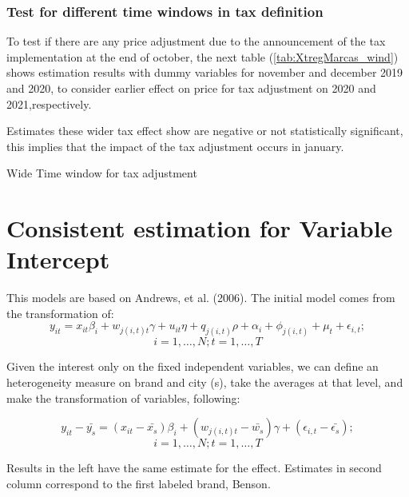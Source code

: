 \documentclass[]{article}
\begin{document}
\subsubsection{Test for different time windows in tax definition}
To test if there are any price adjustment due to the announcement of the tax implementation at the end of october, the next table (\ref{tab:XtregMarcas_wind}) shows estimation results with dummy variables for november and december 2019 and 2020, to consider earlier effect on price for tax adjustment on 2020 and 2021,respectively.
 
Estimates these wider tax effect show are negative or not statistically significant, this implies that the impact of the tax adjustment occurs in january. 

\begin{landscape}
 	\begin{table}[ht]
 	\centering
 	\caption{Wide Time window for tax adjustment \label{tab:XtregMarcas_wind}}
 	
 \end{table}
\end{landscape}
 
\section{Consistent estimation for Variable Intercept}
This models are based on Andrews, et al. (2006). The initial model comes from the transformation of:
\begin{equation*}
	y_{it} = x_{it} \beta_{i} + w_{j(i,t)t} \gamma + u_{it} \eta + q_{j(i,t)} \rho + \alpha_{i}  + \phi_{j(i,t)} + \mu_{t} + \epsilon_{i,t}; 
\end{equation*}
$$i = 1,\ldots,N; t=1,\ldots,T$$

Given the interest only on the fixed independent variables, we can define an heterogeneity measure on brand and city (s), take the averages at that level, and make the transformation of variables, following:
 
\begin{equation*}
y_{it} - \bar{y_s} = (x_{it} - \bar{x_{s}}) \beta_{i} + (w_{j(i,t)t}-\bar{w_{s}}) \gamma + (\epsilon_{i,t} - \bar{\epsilon_{s}}); 
\end{equation*}
$$i = 1,\ldots,N; t=1,\ldots,T$$
 
Results in the left have the same estimate for the effect. Estimates in second column correspond to the first labeled brand, Benson.
 
\end{document}
